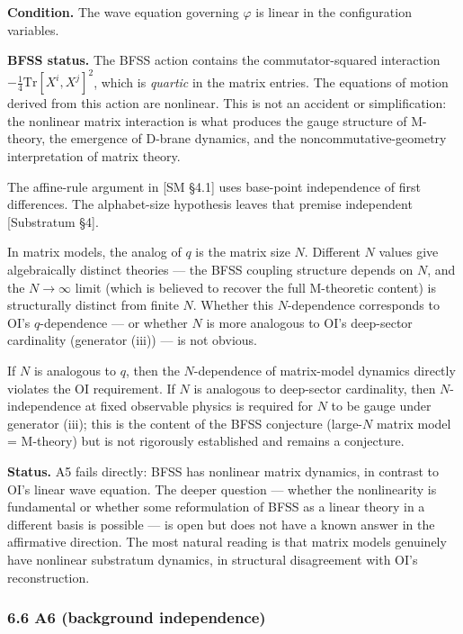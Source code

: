 \documentclass[
]{article}
\begin{document}
\textbf{Condition.} The wave equation governing \(\varphi\) is linear in
the configuration variables.

\textbf{BFSS status.} The BFSS action contains the commutator-squared
interaction \(-\frac{1}{4}\text{Tr}[X^i, X^j]^2\), which is
\emph{quartic} in the matrix entries. The equations of motion derived
from this action are nonlinear. This is not an accident or
simplification: the nonlinear matrix interaction is what produces the
gauge structure of M-theory, the emergence of D-brane dynamics, and the
noncommutative-geometry interpretation of matrix theory.

The affine-rule argument in {[}SM §4.1{]} uses base-point independence
of first differences. The alphabet-size hypothesis leaves that premise
independent {[}Substratum §4{]}.

In matrix models, the analog of \(q\) is the matrix size \(N\).
Different \(N\) values give algebraically distinct theories --- the BFSS
coupling structure depends on \(N\), and the \(N \to \infty\) limit
(which is believed to recover the full M-theoretic content) is
structurally distinct from finite \(N\). Whether this \(N\)-dependence
corresponds to OI's \(q\)-dependence --- or whether \(N\) is more
analogous to OI's deep-sector cardinality (generator (iii)) --- is not
obvious.

If \(N\) is analogous to \(q\), then the \(N\)-dependence of
matrix-model dynamics directly violates the OI requirement. If \(N\) is
analogous to deep-sector cardinality, then \(N\)-independence at fixed
observable physics is required for \(N\) to be gauge under generator
(iii); this is the content of the BFSS conjecture (large-\(N\) matrix
model = M-theory) but is not rigorously established and remains a
conjecture.

\textbf{Status.} A5 fails directly: BFSS has nonlinear matrix dynamics,
in contrast to OI's linear wave equation. The deeper question ---
whether the nonlinearity is fundamental or whether some reformulation of
BFSS as a linear theory in a different basis is possible --- is open but
does not have a known answer in the affirmative direction. The most
natural reading is that matrix models genuinely have nonlinear
substratum dynamics, in structural disagreement with OI's
reconstruction.

\hypertarget{a6-background-independence}{%
\subsubsection{6.6 A6 (background
independence)}\label{a6-background-independence}}
\end{document}

